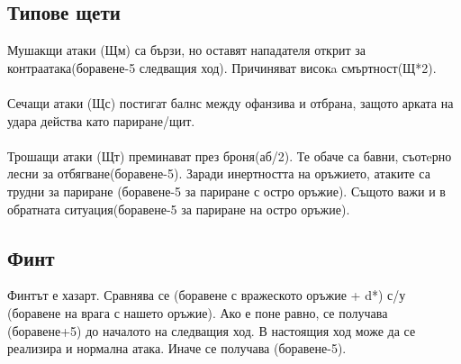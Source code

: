 \subsection{Типове щети}
Мушакщи атаки (Щм) са бързи, но оставят нападателя открит за контраатака(боравене-5 следващия ход).
Причиняват високa смъртност(Щ*2).
\\
\\
Сечащи атаки (Щс) постигат балнс между офанзива и отбрана, защото арката на удара действа като париране/щит.
\\
\\
Трошащи атаки (Щт) преминават през броня(аб/2).
Те обаче са бавни, съотeрно лесни за отбягване(боравене-5).
Заради инертността на оръжието, атаките са трудни за париране (боравене-5 за париране с остро оръжие).
Същото важи и в обратната ситуация(боравене-5 за париране на остро оръжие).


\subsection{Финт}
Финтът е хазарт.
Сравнява се (боравене с вражеското оръжие + d*) с/у (боравене на врага с нашето оръжие).
Ако е поне равно, се получава (боравене+5) до началото на следващия ход.
В настоящия ход може да се реализира и нормална атака.
Иначе се получава (боравене-5).


